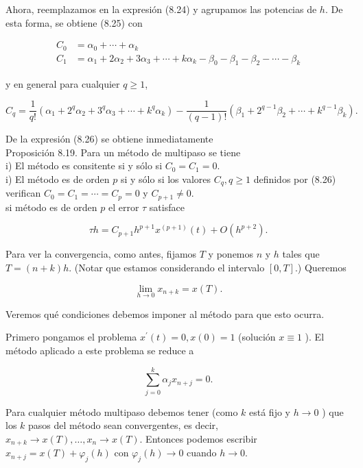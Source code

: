 \documentclass[10pt]{article}
\begin{document}
Ahora, reemplazamos en la expresión (8.24) y agrupamos las potencias de $h$. De esta forma, se obtiene (8.25) con

$$
\begin{aligned}
C_{0} & =\alpha_{0}+\cdots+\alpha_{k} \\
C_{1} & =\alpha_{1}+2 \alpha_{2}+3 \alpha_{3}+\cdots+k \alpha_{k}-\beta_{0}-\beta_{1}-\beta_{2}-\cdots-\beta_{k}
\end{aligned}
$$

y en general para cualquier $q \geq 1$,


\begin{equation*}
C_{q}=\frac{1}{q!}\left(\alpha_{1}+2^{q} \alpha_{2}+3^{q} \alpha_{3}+\cdots+k^{q} \alpha_{k}\right)-\frac{1}{(q-1)!}\left(\beta_{1}+2^{q-1} \beta_{2}+\cdots+k^{q-1} \beta_{k}\right) . \tag{8.26}
\end{equation*}


De la expresión (8.26) se obtiene inmediatamente\\
Proposición 8.19. Para un método de multipaso se tiene\\
i) El método es consitente si y sólo si $C_{0}=C_{1}=0$.\\
i) El método es de orden $p$ si y sólo si los valores $C_{q}, q \geq 1$ definidos por (8.26) verifican $C_{0}=C_{1}=\cdots=C_{p}=0$ y $C_{p+1} \neq 0$.\\
si método es de orden $p$ el error $\tau$ satisface

$$
\tau h=C_{p+1} h^{p+1} x^{(p+1)}(t)+O\left(h^{p+2}\right) .
$$

Para ver la convergencia, como antes, fijamos $T$ y ponemos $n$ y $h$ tales que $T=(n+k) h$. (Notar que estamos considerando el intervalo $[0, T]$.) Queremos

$$
\lim _{h \rightarrow 0} x_{n+k}=x(T) .
$$

Veremos qué condiciones debemos imponer al método para que esto ocurra.

Primero pongamos el problema $x^{\prime}(t)=0, x(0)=1$ (solución $x \equiv 1$ ). El método aplicado a este problema se reduce a

$$
\sum_{j=0}^{k} \alpha_{j} x_{n+j}=0 .
$$

Para cualquier método multipaso debemos tener (como $k$ está fijo y $h \rightarrow 0$ ) que los $k$ pasos del método sean convergentes, es decir, $x_{n+k} \rightarrow x(T), \ldots, x_{n} \rightarrow x(T)$. Entonces podemos escribir $x_{n+j}=x(T)+\varphi_{j}(h)$ con $\varphi_{j}(h) \rightarrow 0$ cuando $h \rightarrow 0$.
\end{document}

